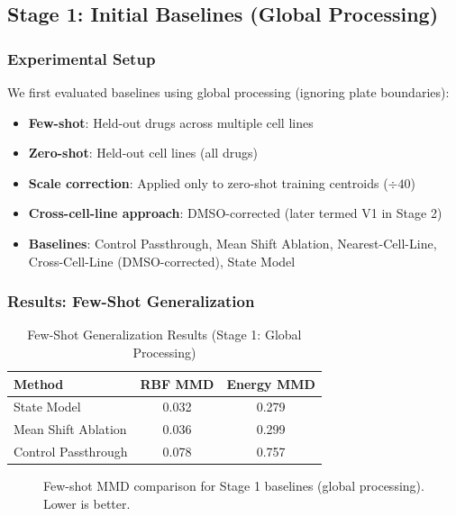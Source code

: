 \documentclass[conference]{IEEEtran}
\begin{document}
\subsection{Stage 1: Initial Baselines (Global Processing)}

\subsubsection{Experimental Setup}

We first evaluated baselines using global processing (ignoring plate boundaries):
\begin{itemize}
    \item \textbf{Few-shot}: Held-out drugs across multiple cell lines
    \item \textbf{Zero-shot}: Held-out cell lines (all drugs)
    \item \textbf{Scale correction}: Applied only to zero-shot training centroids ($\div 40$)
    \item \textbf{Cross-cell-line approach}: DMSO-corrected (later termed V1 in Stage 2)
    \item \textbf{Baselines}: Control Passthrough, Mean Shift Ablation, Nearest-Cell-Line, Cross-Cell-Line (DMSO-corrected), State Model
\end{itemize}

\subsubsection{Results: Few-Shot Generalization}

\begin{table}[h]
\centering
\caption{Few-Shot Generalization Results (Stage 1: Global Processing)}
\label{tab:fewshot-stage1}
\begin{tabular}{lcc}
\toprule
\textbf{Method} & \textbf{RBF MMD} & \textbf{Energy MMD} \\
\midrule
State Model & 0.032 & 0.279 \\
Mean Shift Ablation & 0.036 & 0.299 \\
Control Passthrough & 0.078 & 0.757 \\
\bottomrule
\end{tabular}
\end{table}

\begin{figure}[h]
\centering
\caption{Few-shot MMD comparison for Stage 1 baselines (global processing). Lower is better.}
\label{fig:fewshot-stage1}
\end{figure}
\end{document}
